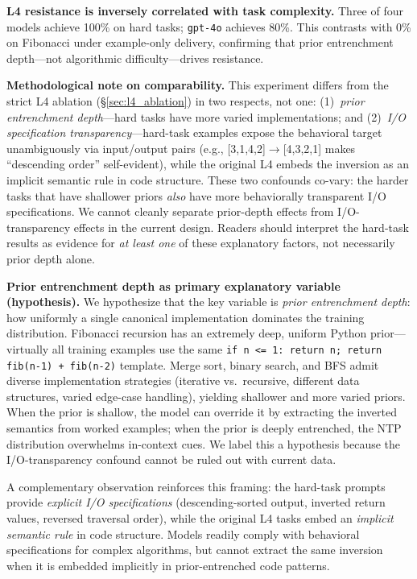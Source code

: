 \textbf{L4 resistance is inversely correlated with task complexity.} Three of four models achieve 100\% on hard tasks; \texttt{gpt-4o} achieves 80\%. This contrasts with 0\% on Fibonacci under example-only delivery, confirming that prior entrenchment depth---not algorithmic difficulty---drives resistance.

\textbf{Methodological note on comparability.} This experiment differs from the strict L4 ablation (\S\ref{sec:l4_ablation}) in two respects, not one: (1)~\emph{prior entrenchment depth}---hard tasks have more varied implementations; and (2)~\emph{I/O specification transparency}---hard-task examples expose the behavioral target unambiguously via input/output pairs (e.g., [3,1,4,2]$\to$[4,3,2,1] makes ``descending order'' self-evident), while the original L4 embeds the inversion as an implicit semantic rule in code structure. These two confounds co-vary: the harder tasks that have shallower priors \emph{also} have more behaviorally transparent I/O specifications. We cannot cleanly separate prior-depth effects from I/O-transparency effects in the current design. Readers should interpret the hard-task results as evidence for \emph{at least one} of these explanatory factors, not necessarily prior depth alone.

\textbf{Prior entrenchment depth as primary explanatory variable (hypothesis).}
We hypothesize that the key variable is \emph{prior entrenchment depth}: how uniformly a single canonical implementation dominates the training distribution. Fibonacci recursion has an extremely deep, uniform Python prior---virtually all training examples use the same \texttt{if n <= 1: return n; return fib(n-1) + fib(n-2)} template. Merge sort, binary search, and BFS admit diverse implementation strategies (iterative vs.\ recursive, different data structures, varied edge-case handling), yielding shallower and more varied priors. When the prior is shallow, the model can override it by extracting the inverted semantics from worked examples; when the prior is deeply entrenched, the NTP distribution overwhelms in-context cues. We label this a hypothesis because the I/O-transparency confound cannot be ruled out with current data.

A complementary observation reinforces this framing: the hard-task prompts provide \emph{explicit I/O specifications} (descending-sorted output, inverted return values, reversed traversal order), while the original L4 tasks embed an \emph{implicit semantic rule} in code structure. Models readily comply with behavioral specifications for complex algorithms, but cannot extract the same inversion when it is embedded implicitly in prior-entrenched code patterns.

